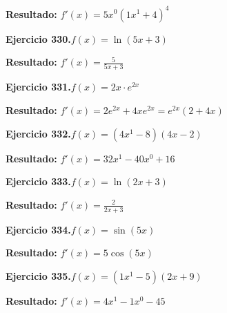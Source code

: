 \documentclass[10pt,a4paper]{article}
\begin{document}
\begin{solbox}
\textbf{Resultado:} \(\displaystyle f'(x) = 5x^{0}(1x^{1} +4)^{4}\)
\end{solbox}

\begin{ejbox}
\textbf{Ejercicio 330.}\quad $f(x) = \ln(5x + 3)$
\end{ejbox}

\begin{solbox}
\textbf{Resultado:} \(\displaystyle f'(x) = \frac{5}{5x + 3}\)
\end{solbox}

\newpage
\begin{ejbox}
\textbf{Ejercicio 331.}\quad $f(x) = 2x \cdot e^{2x}$
\end{ejbox}

\begin{solbox}
\textbf{Resultado:} \(\displaystyle f'(x) = 2e^{2x} + 4xe^{2x} = e^{2x}(2 + 4x)\)
\end{solbox}

\begin{ejbox}
\textbf{Ejercicio 332.}\quad $f(x) = (4x^{1} -8)(4x -2)$
\end{ejbox}

\begin{solbox}
\textbf{Resultado:} \(\displaystyle f'(x) = 32x^{1} -40x^{0} +16\)
\end{solbox}

\begin{ejbox}
\textbf{Ejercicio 333.}\quad $f(x) = \ln(2x + 3)$
\end{ejbox}

\begin{solbox}
\textbf{Resultado:} \(\displaystyle f'(x) = \frac{2}{2x + 3}\)
\end{solbox}

\newpage
\begin{ejbox}
\textbf{Ejercicio 334.}\quad $f(x) = \sin(5x)$
\end{ejbox}

\begin{solbox}
\textbf{Resultado:} \(\displaystyle f'(x) = 5\cos(5x)\)
\end{solbox}

\begin{ejbox}
\textbf{Ejercicio 335.}\quad $f(x) = (1x^{1} -5)(2x +9)$
\end{ejbox}

\begin{solbox}
\textbf{Resultado:} \(\displaystyle f'(x) = 4x^{1} -1x^{0} -45\)
\end{solbox}
\end{document}
